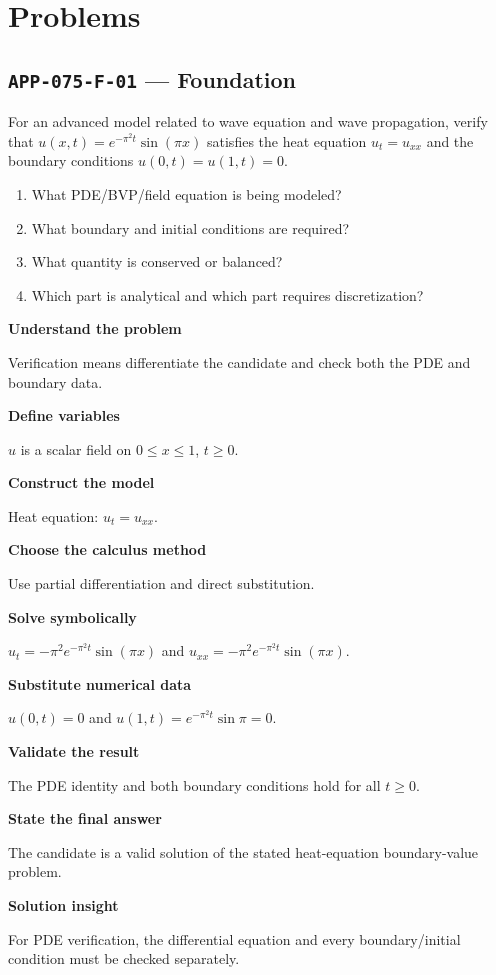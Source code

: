 \documentclass[11pt]{book}
\newcommand{\pid}[1]{\texttt{#1}}
\begin{document}
\section*{Problems}
\subsection*{\pid{APP-075-F-01} — Foundation}
\begin{problembox}
For an advanced model related to wave equation and wave propagation, verify that $u(x,t)=e^{-\pi^2t}\sin(\pi x)$ satisfies the heat equation $u_t=u_{xx}$ and the boundary conditions $u(0,t)=u(1,t)=0$.
\end{problembox}
\begin{promptbox}\begin{enumerate}
\item What PDE/BVP/field equation is being modeled?
\item What boundary and initial conditions are required?
\item What quantity is conserved or balanced?
\item Which part is analytical and which part requires discretization?
\end{enumerate}\end{promptbox}
\begin{solutionbox}
\textbf{Understand the problem}\par Verification means differentiate the candidate and check both the PDE and boundary data.\par\medskip
\textbf{Define variables}\par $u$ is a scalar field on $0\le x\le1$, $t\ge0$.\par\medskip
\textbf{Construct the model}\par Heat equation: $u_t=u_{xx}$.\par\medskip
\textbf{Choose the calculus method}\par Use partial differentiation and direct substitution.\par\medskip
\textbf{Solve symbolically}\par $u_t=-\pi^2 e^{-\pi^2t}\sin(\pi x)$ and $u_{xx}=-\pi^2 e^{-\pi^2t}\sin(\pi x)$.\par\medskip
\textbf{Substitute numerical data}\par $u(0,t)=0$ and $u(1,t)=e^{-\pi^2t}\sin\pi=0$.\par\medskip
\textbf{Validate the result}\par The PDE identity and both boundary conditions hold for all $t\ge0$.\par\medskip
\textbf{State the final answer}\par The candidate is a valid solution of the stated heat-equation boundary-value problem.\par\medskip
\textbf{Solution insight}\par For PDE verification, the differential equation and every boundary/initial condition must be checked separately.\par\medskip
\end{solutionbox}
\end{document}
